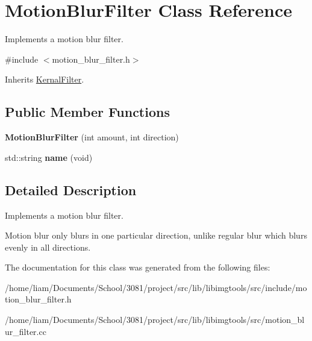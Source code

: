 \hypertarget{classMotionBlurFilter}{}\section{Motion\+Blur\+Filter Class Reference}
\label{classMotionBlurFilter}


Implements a motion blur filter.  




{\ttfamily \#include $<$motion\+\_\+blur\+\_\+filter.\+h$>$}



Inherits \hyperlink{classKernalFilter}{Kernal\+Filter}.

\subsection*{Public Member Functions}
\begin{DoxyCompactItemize}
\item 
{\bfseries Motion\+Blur\+Filter} (int amount, int direction)\hypertarget{classMotionBlurFilter_a8271e366ee5c47f713cb264b9615b30f}{}\label{classMotionBlurFilter_a8271e366ee5c47f713cb264b9615b30f}

\item 
std\+::string {\bfseries name} (void)\hypertarget{classMotionBlurFilter_a131ee8377cdf61a9542d5f17e504e8fe}{}\label{classMotionBlurFilter_a131ee8377cdf61a9542d5f17e504e8fe}

\end{DoxyCompactItemize}


\subsection{Detailed Description}
Implements a motion blur filter. 

Motion blur only blurs in one particular direction, unlike regular blur which blurs evenly in all directions. 

The documentation for this class was generated from the following files\+:\begin{DoxyCompactItemize}
\item 
/home/liam/\+Documents/\+School/3081/project/src/lib/libimgtools/src/include/motion\+\_\+blur\+\_\+filter.\+h\item 
/home/liam/\+Documents/\+School/3081/project/src/lib/libimgtools/src/motion\+\_\+blur\+\_\+filter.\+cc\end{DoxyCompactItemize}
